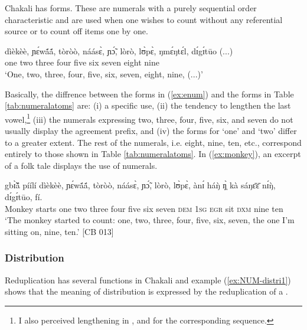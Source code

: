 \begin{exe}
\begin{exe}
\begin{exe}
\begin{exe}
\begin{exe}
\begin{exe}
\begin{exe}
\begin{exe}
\begin{exe}
\begin{exe}
Chakali has  forms. These  are numerals
with a purely sequential order characteristic and are used when one wishes
to count without 
any referential source or  to count off items one by one.

 \ea\label{ex:enum}
\gll dìèkèè, ɲɛ́wã́ã́, tòròò,  náásɛ̀,  ɲɔ̃́, lòrò, lʊ̀pɛ̀, 
ŋmɛ́ŋtɛ́l, dɪ́gɪ́tūo   (...)\\
one two three four five six seven eight nine {}\\
\glt `One,  two, three, four, five, six, seven,  eight, nine,  (...)' \\
\z

\newpage
Basically, the diffrence between the forms in (\ref{ex:enum}) and  the forms in  Table \ref{tab:numeralatoms} are: 
(i) a specific  use, 
(ii) the tendency to lengthen the last
vowel,\footnote{I also perceived lengthening  in ,  and
 for the
corresponding 
sequence.}
(iii)  the numerals  expressing two, three, four, five,
six, and seven do not usually display the agreement prefix,  and
(iv) the forms for `one'
and `two' differ to a greater extent. The rest of the  numerals, i.e. eight, nine, ten, 
etc., 
correspond entirely to those shown in Table
\ref{tab:numeralatoms}.  In (\ref{ex:monkey}), an excerpt of a folk tale
displays the
 use of numerals.

\begin{exe}
 \ex\label{ex:monkey}

\gll gbɪ̃̀ã́  píílí dìèkèè, ɲɛ́wã́ã́, tòròò,  náásɛ̀,  ɲɔ̃́, lòrò, lʊ̀pɛ̀, ànɪ́ 
háŋ̀ ŋ̩̀ kà sáŋɛ̄ɛ̄ nɪ́ŋ̀, dɪ́gɪ́tūo, fí.\\
Monkey starts one two three four five six seven {\conn}  \textsc{dem}
\textsc{1sg} \textsc{egr} sit  \textsc{dxm} nine ten\\
\glt `The monkey started to count: one, two, three, four, five, six, seven, the
one I'm sitting on, nine, ten.' [CB 013]
\end{exe}



\subsubsection{Distribution}
\label{sec:NUM-distri}

Reduplication has several functions in Chakali and example 
(\ref{ex:NUM-distri1}) shows that the meaning of
distribution is expressed by the reduplication of a .


\end{exe}
\end{exe}
\end{exe}
\end{exe}
\end{exe}
\end{exe}
\end{exe}
\end{exe}
\end{exe}
\end{exe}
